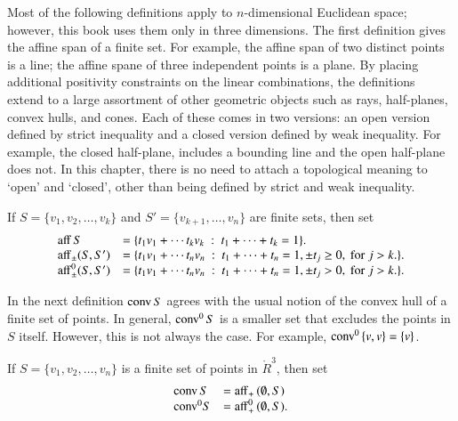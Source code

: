 
Most of the following definitions apply to $n$-dimensional
Euclidean space; however, this book uses them only in
three dimensions.  The first definition 
gives the affine span of a finite set.  For example,
the affine span of two distinct points is a line;
the affine spane of three independent points is a plane.
By placing additional
positivity constraints on the linear combinations, the definitions
extend to a large assortment of other geometric objects
such as rays, half-planes, convex hulls, and cones.  
Each of these comes in two versions: an open version
defined by strict inequality and a closed version defined
by weak inequality.  For example, the closed half-plane,
includes a bounding line and the open half-plane does
not.  In this chapter, there is no need
to attach a topological meaning to `open' and `closed',
other than being defined by strict and weak inequality.


\begin{definition}[affine]\label{def:aff} 
 If $S = \{v_1,v_2,\ldots,v_k\}$ 
and $S'=\{v_{k+1},\ldots,v_n\}$ are  finite sets, then
set
	$$\begin{array}{lll}
      {\operatorname{aff}}\, S &= \{t_1 v_1 +\cdots t_k v_k \ :\ 
	t_1 +\cdots+t_k = 1\}.\\
        {\operatorname{aff}}_{\pm} (S,S') &= \{t_1 v_1 +\cdots t_n v_n \ :\ 
	t_1 +\cdots+t_n = 1, \pm t_j \ge 0, \text{ for } j>k.\}.\\
        {\operatorname{aff}}^0_{\pm} (S,S') &= \{t_1 v_1 +\cdots t_n v_n \ :\ 
	t_1 +\cdots+t_n = 1, \pm t_j > 0, \text{ for } j>k.\}.\\
		\end{array}
        $$
\end{definition}


In the next definition ${\operatorname{conv}}\,S$ agrees with the usual
notion of the convex hull of a finite set of points.
In general, ${\operatorname{conv}}^0\,S$ is a smaller set that excludes
the points in $S$ itself.  However, this is not always the case.
For example, ${\operatorname{conv}}^0\,\{v,v\} = \{v\}$.


\begin{definition}  If $S = \{v_1,v_2,\ldots,v_n\}$ is a finite set
of points in $\ring{R}^3$, then
set
	$$
        \begin{array}{lll}
          {\operatorname{conv}}\, S &= {\operatorname{aff}}_+\, (\emptyset,S)\\
	   {\operatorname{conv}}^0 S &= {\operatorname{aff}}^0_+\, (\emptyset,S).\\
           \end{array}
        $$
\end{definition}

